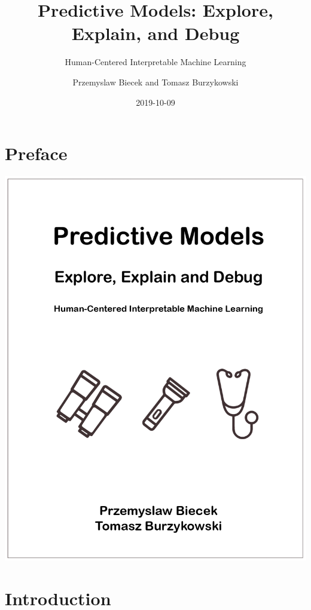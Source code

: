 \documentclass[12pt,]{krantz}
\title{Predictive Models: Explore, Explain, and Debug}
\subtitle{Human-Centered Interpretable Machine Learning}
\author{Przemyslaw Biecek and Tomasz Burzykowski}
\date{2019-10-09}
\begin{document}
\maketitle

{
\hypersetup{linkcolor=black}
\setcounter{tocdepth}{2}
\tableofcontents
}
\listoftables
\listoffigures
\hypertarget{preface}{%
\section*{Preface}\label{preface}}

\begin{center}\includegraphics[width=0.99\linewidth]{figure/front} \end{center}

\hypertarget{introduction}{%
\section{Introduction}\label{introduction}}
\end{document}
